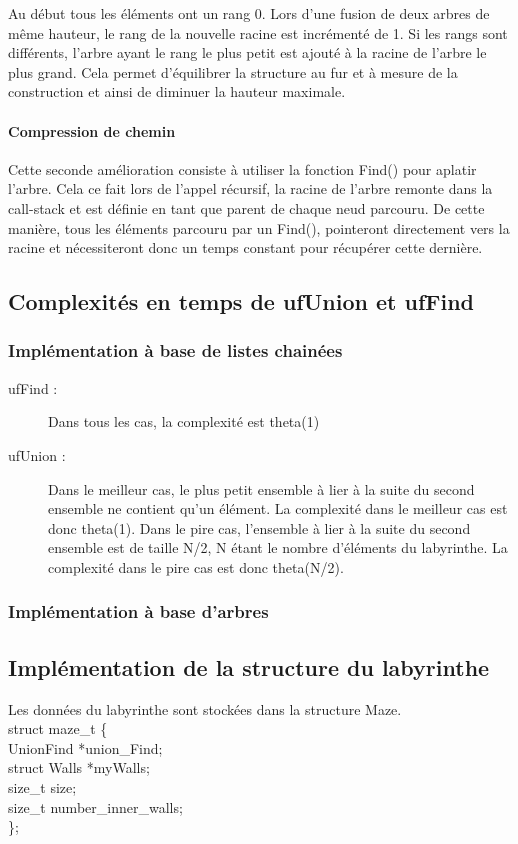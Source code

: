 \documentclass[11pt]{article}
\begin{document}
	Au début tous les éléments ont un rang 0. Lors d'une fusion de deux arbres de même hauteur, le rang de la nouvelle racine est incrémenté de 1. Si les rangs sont différents, l'arbre ayant le rang le plus petit est ajouté à la racine de l'arbre le plus grand. Cela permet d'équilibrer la structure au fur et à mesure de la construction et ainsi de diminuer la hauteur maximale.
	
	\paragraph{Compression de chemin}
	Cette seconde amélioration consiste à utiliser la fonction Find() pour aplatir l'arbre. Cela ce fait lors de l'appel récursif, la racine de l'arbre remonte dans la call-stack et est définie en tant que parent de chaque neud parcouru. De cette manière, tous les éléments parcouru par un Find(), pointeront directement vers la racine et nécessiteront donc un temps constant pour récupérer cette dernière.

\subsection{Complexités en temps de ufUnion et ufFind}

\subsubsection{Implémentation à base de listes chainées}

\begin{description}
\item[ufFind :] Dans tous les cas, la complexité est theta(1)
\item[ufUnion :] Dans le meilleur cas, le plus petit ensemble à lier à la suite du second ensemble ne contient qu'un élément. La complexité dans le meilleur cas est donc theta(1). Dans le pire cas, l'ensemble à lier à la suite du second ensemble est de taille N/2, N étant le nombre d'éléments du labyrinthe. La complexité dans le pire cas est donc theta(N/2).
\end{description}
\subsubsection{Implémentation à base d'arbres}


\subsection{Implémentation de la structure du labyrinthe}
Les données du labyrinthe sont stockées dans la structure Maze. \\
struct maze\_t \{ \\
\quad    UnionFind *union\_Find; \\
\quad     struct Walls *myWalls; \\
\quad     size\_t size; \\
\quad     size\_t number\_inner\_walls; \\
\};\\
\end{document}
